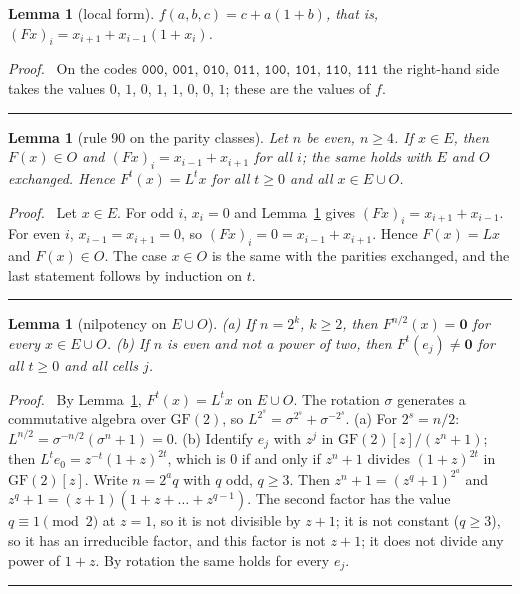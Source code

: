\documentclass[10pt,a4paper]{article}
\newtheorem{lemma}[theorem]{Lemma}
\newcommand{\qedmark}{\rule{1.1ex}{1.1ex}}
\newenvironment{proof}[1][Proof]{\par\smallskip\noindent\textit{#1.}\ }{\hfill\qedmark\par\smallskip}
\newcommand{\zero}{\mathbf{0}}                %
\newcommand{\code}[1]{\mathtt{#1}}            %
\begin{document}
\begin{lemma}[local form]\label{154:lem:local}
$f(a,b,c)=c+a(1+b)$, that is, $(Fx)_i=x_{i+1}+x_{i-1}(1+x_i)$.
\end{lemma}
\begin{proof}
On the codes $\code{000}$, $\code{001}$, $\code{010}$, $\code{011}$, $\code{100}$, $\code{101}$, $\code{110}$,
$\code{111}$ the right-hand side takes the values $0$, $1$, $0$, $1$, $1$, $0$, $0$, $1$; these are the values of
$f$.
\end{proof}

\begin{lemma}[rule 90 on the parity classes]\label{154:lem:rule90}
Let $n$ be even, $n\ge 4$. If $x\in E$, then $F(x)\in O$ and $(Fx)_i=x_{i-1}+x_{i+1}$ for all $i$; the same holds
with $E$ and $O$ exchanged. Hence $F^t(x)=L^tx$ for all $t\ge 0$ and all $x\in E\cup O$.
\end{lemma}
\begin{proof}
Let $x\in E$. For odd $i$, $x_i=0$ and Lemma~\ref{154:lem:local} gives $(Fx)_i=x_{i+1}+x_{i-1}$. For even $i$,
$x_{i-1}=x_{i+1}=0$, so $(Fx)_i=0=x_{i-1}+x_{i+1}$. Hence $F(x)=Lx$ and $F(x)\in O$. The case $x\in O$ is the same
with the parities exchanged, and the last statement follows by induction on $t$.
\end{proof}

\begin{lemma}[nilpotency on $E\cup O$]\label{154:lem:nilpotent}
\textup{(a)} If $n=2^k$, $k\ge 2$, then $F^{n/2}(x)=\zero$ for every $x\in E\cup O$.
\textup{(b)} If $n$ is even and not a power of two, then $F^t(e_j)\neq\zero$ for all $t\ge 0$ and all cells $j$.
\end{lemma}
\begin{proof}
By Lemma~\ref{154:lem:rule90}, $F^t(x)=L^tx$ on $E\cup O$. The rotation $\sigma$ generates a commutative algebra
over $\mathrm{GF}(2)$, so $L^{2^s}=\sigma^{2^s}+\sigma^{-2^s}$.
(a) For $2^s=n/2$: $L^{n/2}=\sigma^{-n/2}(\sigma^n+1)=0$.
(b) Identify $e_j$ with $z^j$ in $\mathrm{GF}(2)[z]/(z^n+1)$; then $L^te_0=z^{-t}(1+z)^{2t}$, which is $0$ if and
only if $z^n+1$ divides $(1+z)^{2t}$ in $\mathrm{GF}(2)[z]$. Write $n=2^aq$ with $q$ odd, $q\ge 3$. Then
$z^n+1=(z^q+1)^{2^a}$ and $z^q+1=(z+1)(1+z+\dots+z^{q-1})$. The second factor has the value $q\equiv 1\pmod 2$ at
$z=1$, so it is not divisible by $z+1$; it is not constant ($q\ge3$), so it has an irreducible factor, and this
factor is not $z+1$; it does not divide any power of $1+z$. By rotation the same holds for every $e_j$.
\end{proof}
\end{document}
